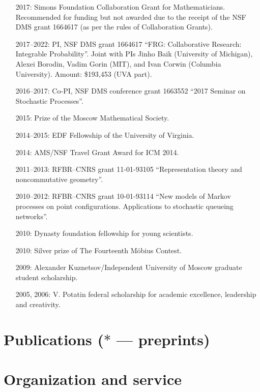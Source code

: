 \documentclass[letterpaper,11pt]{article}
\begin{document}
\begin{itemize}
		
	\item
	      [2017:] Simons Foundation Collaboration Grant for
	      Mathematicians. Recommended for funding but not awarded due to
	      the receipt of the NSF DMS grant 1664617 (as per the rules of Collaboration
	      Grants).
	\item
			[2017--2022:] PI, NSF DMS grant 1664617
	      ``FRG: Collaborative Research: Integrable Probability''.
	      Joint with PIs Jinho Baik (University of Michigan), Alexei
	      Borodin, Vadim Gorin (MIT), and Ivan Corwin (Columbia University). Amount:
	      \$193,453 (UVA part).
	\item
		[2016--2017:] Co-PI,
	      NSF DMS conference grant 1663552 ``2017 Seminar on Stochastic
				Processes''.
	\item
	      [2015:] Prize of the Moscow Mathematical Society.
	\item
	      [2014--2015:] EDF Fellowship of the University of Virginia.
	\item
	      [2014:] AMS/NSF Travel Grant Award for ICM 2014.
	\item
	      [2011--2013:] RFBR--CNRS grant 11-01-93105 ``Representation
	      theory and noncommutative geometry''.
	\item
	      [2010--2012:] RFBR--CNRS grant 10-01-93114 ``New models of
	      Markov processes on point configurations. Applications to
	      stochastic queueing networks''.
	\item
	      [2010:] Dynasty foundation fellowship for young scientists.
	\item
	      [2010:] Silver prize of The Fourteenth M\"obius Contest.
	\item
	      [2009:] Alexander Kuznetsov/Independent University of Moscow
	      graduate student scholarship.
	\item
	      [2005, 2006:] V. Potatin federal scholarship for academic
	      excellence, leadership and creativity.
\end{itemize}

\section*{Publications ($*$ --- preprints)}



\section*{Organization and service}
\end{document}
